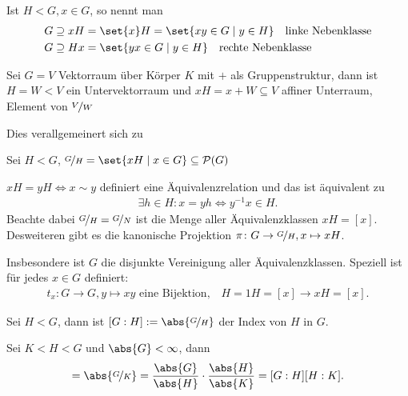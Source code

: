 \begin{definition}
	Ist $H < G, x \in G$, so nennt man
	\begin{align*}
	G \supseteq x H &= \set{x}H = \set{xy \in G \mid y \in H} \quad \text{linke Nebenklasse}\\
	G \supseteq H x &= \set{yx \in G \mid y \in H} \quad \text{rechte Nebenklasse}
	\end{align*}
\end{definition}
\begin{example}
	Sei $G = V$ Vektorraum über Körper $K$ mit $+$ als Gruppenstruktur, dann ist $H = W < V$ ein Untervektorraum und $xH = x + W \subseteq V$ affiner Unterraum, Element von $\lnkset{V}{W}$
\end{example}
Dies verallgemeinert sich zu
\begin{definition}
	Sei $H < G$, $\lnkset{G}{H} = \set{x H \mid x \in G} \subseteq \powerset(G)$
\end{definition}
\begin{remark}
	$xH = yH \Leftrightarrow x \sim y$ definiert eine Äquivalenzrelation und das ist äquivalent zu
	\begin{align*}
		\exists h \in H: x = yh \Leftrightarrow y^{-1}x \in H.
	\end{align*}
	Beachte dabei $\lnkset{G}{H} = \lnkset{G}{N}$ ist die Menge aller Äquivalenzklassen $xH = [x]$. Desweiteren gibt es die kanonische Projektion $\pi\colon G \to \lnkset{G}{H},x \mapsto xH$.
	
	Insbesondere ist $G$ die disjunkte Vereinigung aller Äquivalenzklassen. Speziell ist für jedes $x \in G$ definiert:
	\begin{align*}
		t_x\colon G \to G, y \mapsto xy \text{ eine Bijektion,} \quad H = 1H = [x] \to xH = [x].
	\end{align*}
\end{remark}

\begin{definition}[Index]
	Sei $H < G$, dann ist $[G:H] := \abs{\lnkset{G}{H}}$ der Index von $H$ in $G$.
\end{definition}

\begin{conclusion}
	Sei $K < H < G$ und $\abs{G} < \infty$, dann
	\begin{align*}
	[G:K] = \abs{\lnkset{G}{K}} = \frac{\abs{G}}{\abs{H}}\cdot \frac{\abs{H}}{\abs{K}} = [G:H][H:K].
	\end{align*}
\end{conclusion}

